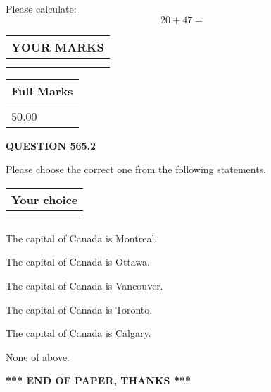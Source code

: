 \documentclass[12pt]{article}
\begin{document}
  
 
Please calculate:
\begin{equation}
20 +  %
47 = \nonumber
\end{equation}
 

 

 
  
\vspace{0.2in}
  
\noindent\begin{tabular}{|l|}
\hline
 YOUR MARKS  \\
\hline
 \\ 
 \\ 
\hline
\end{tabular}
\hspace{0.05in} \begin{tabular}{|l|}
\hline
 Full Marks  \\
\hline
 \\ 
50.00 \\
\hline
\end{tabular}
{\textbf{\Large{QUESTION
565.2 
}}}
  
  
Please choose the correct one from the following statements.
  
  
\noindent\hspace{3.0in} \begin{tabular}{|l|}
\hline
Your choice \\
\hline
 \\ 
 \\ 
\hline
\end{tabular}
  
  
 
 
The capital of Canada is Montreal.
 
 
The capital of Canada is Ottawa.
 
 
The capital of Canada is Vancouver.
 
 
The capital of Canada is Toronto.
 
 
The capital of Canada is Calgary.
 
 
 None of above.
 
 
   
   
 \vspace{0.2in}
 
   
   
   
   
\vspace{1.0in} 
{\textbf{\large{ *** END OF PAPER, THANKS *** }}} 
   
\end{document}
